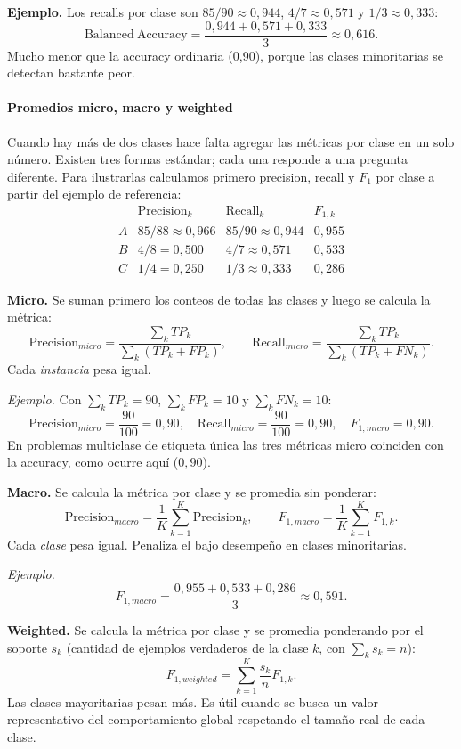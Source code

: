 \documentclass[12pt,oneside]{report}
\begin{document}
\textbf{Ejemplo.} Los recalls por clase son $85/90\approx 0{,}944$,
$4/7\approx 0{,}571$ y $1/3\approx 0{,}333$:
\[
\mathrm{Balanced\ Accuracy}=\frac{0{,}944+0{,}571+0{,}333}{3}\approx 0{,}616.
\]
Mucho menor que la accuracy ordinaria (0{,}90), porque las clases
minoritarias se detectan bastante peor.

\paragraph{Promedios micro, macro y weighted}

Cuando hay más de dos clases hace falta agregar las métricas por clase
en un solo número. Existen tres formas estándar; cada una responde a una
pregunta diferente. Para ilustrarlas calculamos primero precision,
recall y $F_1$ por clase a partir del ejemplo de referencia:
\[
\begin{array}{l|ccc}
 & \mathrm{Precision}_k & \mathrm{Recall}_k & F_{1,k} \\
\hline
A & 85/88\approx 0{,}966 & 85/90\approx 0{,}944 & 0{,}955 \\
B & 4/8 = 0{,}500        & 4/7 \approx 0{,}571  & 0{,}533 \\
C & 1/4 = 0{,}250        & 1/3 \approx 0{,}333  & 0{,}286
\end{array}
\]

\textbf{Micro.} Se suman primero los conteos de todas las clases y luego
se calcula la métrica:
\[
\mathrm{Precision}_{micro}=\frac{\sum_k TP_k}{\sum_k(TP_k+FP_k)},\qquad
\mathrm{Recall}_{micro}=\frac{\sum_k TP_k}{\sum_k(TP_k+FN_k)}.
\]
Cada \emph{instancia} pesa igual.

\emph{Ejemplo.} Con $\sum_k TP_k=90$, $\sum_k FP_k=10$ y $\sum_k FN_k=10$:
\[
\mathrm{Precision}_{micro}=\frac{90}{100}=0{,}90,\quad
\mathrm{Recall}_{micro}=\frac{90}{100}=0{,}90,\quad
F_{1,micro}=0{,}90.
\]
En problemas multiclase de etiqueta única las tres métricas micro
coinciden con la accuracy, como ocurre aquí ($0{,}90$).

\textbf{Macro.} Se calcula la métrica por clase y se promedia sin
ponderar:
\[
\mathrm{Precision}_{macro}=\frac{1}{K}\sum_{k=1}^{K}\mathrm{Precision}_k,\qquad
F_{1,macro}=\frac{1}{K}\sum_{k=1}^{K}F_{1,k}.
\]
Cada \emph{clase} pesa igual. Penaliza el bajo desempeño en clases
minoritarias.

\emph{Ejemplo.}
\[
F_{1,macro}=\frac{0{,}955+0{,}533+0{,}286}{3}\approx 0{,}591.
\]

\textbf{Weighted.} Se calcula la métrica por clase y se promedia
ponderando por el soporte $s_k$ (cantidad de ejemplos verdaderos de la
clase $k$, con $\sum_k s_k = n$):
\[
F_{1,weighted}=\sum_{k=1}^{K}\frac{s_k}{n}F_{1,k}.
\]
Las clases mayoritarias pesan más. Es útil cuando se busca un valor
representativo del comportamiento global respetando el tamaño real de
cada clase.
\end{document}
